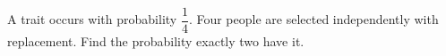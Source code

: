 A trait occurs with probability $\dfrac{1}{4}$. Four people are selected independently with replacement. Find the probability exactly two have it.
